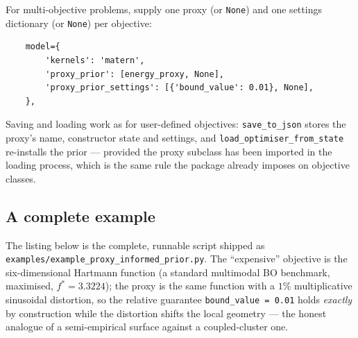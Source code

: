 \documentclass[11pt,a4paper]{article}
\newcommand{\code}[1]{\texttt{#1}}
\begin{document}
For multi-objective problems, supply one proxy (or \code{None}) and one
settings dictionary (or \code{None}) per objective:

\begin{lstlisting}
    model={
        'kernels': 'matern',
        'proxy_prior': [energy_proxy, None],
        'proxy_prior_settings': [{'bound_value': 0.01}, None],
    },
\end{lstlisting}

Saving and loading work as for user-defined objectives:
\code{save\_to\_json} stores the proxy's name, constructor state and
settings, and \code{load\_optimiser\_from\_state} re-installs the prior ---
provided the proxy subclass has been imported in the loading process, which
is the same rule the package already imposes on objective classes.

\subsection{A complete example}
\label{sec:example}

The listing below is the complete, runnable script shipped as
\code{examples/\allowbreak{}example\_proxy\_informed\_prior.py}. The ``expensive''
objective is the six-dimensional Hartmann function (a standard multimodal BO
benchmark, maximised, $f^* = 3.3224$); the proxy is the same function with a
$1\%$ multiplicative sinusoidal distortion, so the relative guarantee
\code{bound\_value = 0.01} holds \emph{exactly} by construction while the
distortion shifts the local geometry --- the honest analogue of a
semi-empirical surface against a coupled-cluster one.
\end{document}
